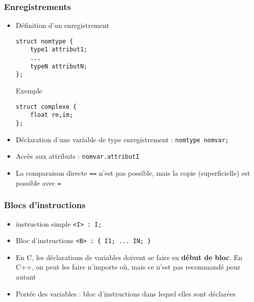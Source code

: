 \begin{frame}[fragile]
\frametitle{Enregistrements}
\begin{itemize}
\item Définition d'un enregistrement
\begin{lstlisting}
struct nomtype {
	type1 attribut1;
	...
	typeN attributN;
};
\end{lstlisting}
\begin{codeblock}{Exemple}
\begin{lstlisting}
struct complexe {
	float re,im;
};
\end{lstlisting}
\end{codeblock}
\item Déclaration d'une variable de type enregistrement : \verb|nomtype nomvar;|
\item Accès aux attributs : \verb|nomvar.attributI|
\item La comparaison directe \verb|==| n'est pas possible, mais la copie (superficielle) est possible avec \verb|=|
\end{itemize}
\end{frame}

\begin{frame}[fragile]
\frametitle{Blocs d'instructions}
\begin{itemize}
\item instruction simple \verb|<I> : I;|
\item Bloc d'instructions \verb|<B> : { I1; ... IN; }|
\item En C, les déclarations de variables doivent se faire en \textbf{début de bloc}. En C++, on peut les faire n'importe où, mais ce n'est pas recommandé pour autant
\item Portée des variables : bloc d'instructions dans lequel elles sont déclarées
\end{itemize}
\end{frame}

